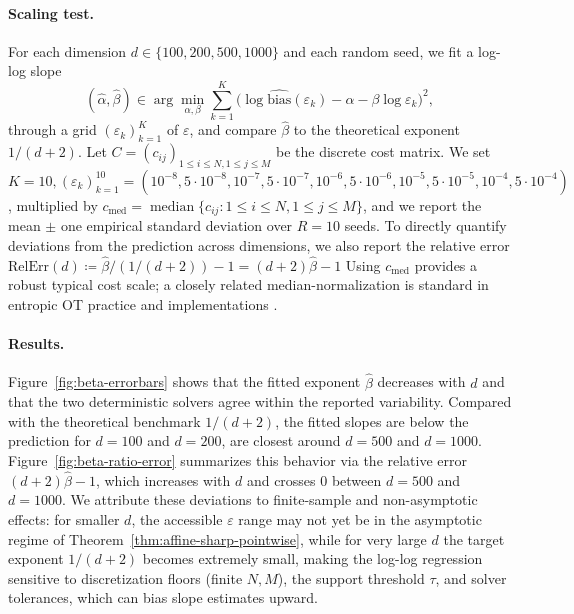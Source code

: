 \documentclass{article}
\theoremstyle{plain}
\theoremstyle{definition}
\theoremstyle{remark}
\numberwithin{equation}{section}
\begin{document}
\paragraph{Scaling test.}
For each dimension $d\in\{100,200,500,1000\}$ and each random seed, we fit a log-log slope
$$
(\widehat\alpha,\widehat\beta)\in\arg\min_{\alpha,\beta}\sum_{k=1}^K\Big(\log\widehat{\mathrm{bias}}(\varepsilon_k)-\alpha-\beta\log\varepsilon_k\Big)^2,
$$
through a grid $(\varepsilon_k)_{k=1}^K$ of $\varepsilon$, and compare $\widehat\beta$ to the theoretical exponent $1/(d+2)$.
Let $C=(c_{ij})_{1\le i\le N,1\le j\le M}$ be the discrete cost matrix.
We set $K=10,(\varepsilon_k)_{k=1}^{10}=(10^{-8},5\cdot10^{-8},10^{-7},5\cdot10^{-7},10^{-6},5\cdot10^{-6},10^{-5},5\cdot10^{-5},10^{-4},5\cdot10^{-4})$, multiplied by $c_{\mathrm{med}}=\operatorname{median}\{c_{ij}:1\le i\le N,1\le j\le M\}$, and we report the mean $\pm$ one empirical standard deviation over $R=10$ seeds.
To directly quantify deviations from the prediction across dimensions, we also report the relative error $\mathrm{RelErr}(d)\coloneqq \widehat\beta/(1/(d+2))-1=(d+2)\widehat\beta-1$
Using $c_{\mathrm{med}}$ provides a robust typical cost scale; a closely related median-normalization is standard in entropic OT practice and implementations \cite{cuturi2013sinkhorn}.
\paragraph{Results.}
Figure~\ref{fig:beta-errorbars} shows that the fitted exponent $\widehat\beta$ decreases with $d$ and that the two deterministic solvers agree within the reported variability.
Compared with the theoretical benchmark $1/(d+2)$, the fitted slopes are below the prediction for $d=100$ and $d=200$, are closest around $d=500$ and $d=1000$.
Figure~\ref{fig:beta-ratio-error} summarizes this behavior via the relative error $(d+2)\widehat\beta-1$, which increases with $d$ and crosses $0$ between $d=500$ and $d=1000$.
We attribute these deviations to finite-sample and non-asymptotic effects: for smaller $d$, the accessible $\varepsilon$ range may not yet be in the asymptotic regime of Theorem~\ref{thm:affine-sharp-pointwise}, while for very large $d$ the target exponent $1/(d+2)$ becomes extremely small, making the log-log regression sensitive to discretization floors (finite $N,M$), the support threshold $\tau$, and solver tolerances, which can bias slope estimates upward.
\end{document}
